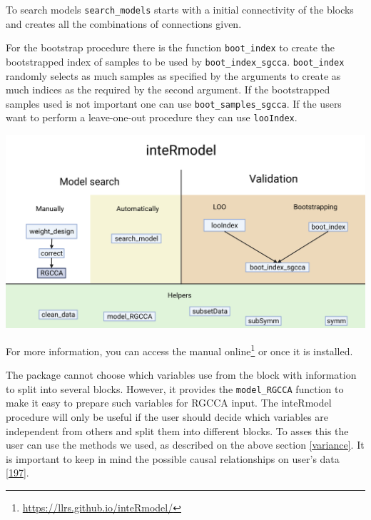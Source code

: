 \documentclass[
  12pt,
  a4paper,
  twoside,
  openright]{book}
\DeclareRobustCommand{\href}[2]{#2\footnote{\url{#1}}}
\let\origfigure\figure
\let\endorigfigure\endfigure
\renewenvironment{figure}[1][2] {
    \expandafter\origfigure\expandafter[!ht]
} {
    \endorigfigure
}
\begin{document}
To search models \texttt{search\_models} starts with a initial connectivity of the blocks and creates all the combinations of connections given.

For the bootstrap procedure there is the function \texttt{boot\_index} to create the bootstrapped index of samples to be used by \texttt{boot\_index\_sgcca}.
\texttt{boot\_index} randomly selects as much samples as specified by the arguments to create as much indices as the required by the second argument.
If the bootstrapped samples used is not important one can use \texttt{boot\_samples\_sgcca}.
If the users want to perform a leave-one-out procedure they can use \texttt{looIndex}.

\begin{figure}
\includegraphics[width=1\linewidth]{images/inteRmodel-workflows} \caption[inteRmodel functions and workflow.]{Functions provided by the inteRmodel package to search and validate models of relationships using RGCCA. Created with BioRender.com}\label{fig:intermodel-workflows}
\end{figure}

For more information, you can access the \href{https://llrs.github.io/inteRmodel/}{manual online} or once it is installed.

The package cannot choose which variables use from the block with information to split into several blocks.
However, it provides the \texttt{model\_RGCCA} function to make it easy to prepare such variables for RGCCA input.
The inteRmodel procedure will only be useful if the user should decide which variables are independent from others and split them into different blocks.
To asses this the user can use the methods we used, as described on the above section \ref{variance}.
It is important to keep in mind the possible causal relationships on user's data {[}\protect\hyperlink{ref-greenland2002}{197}{]}.
\end{document}
